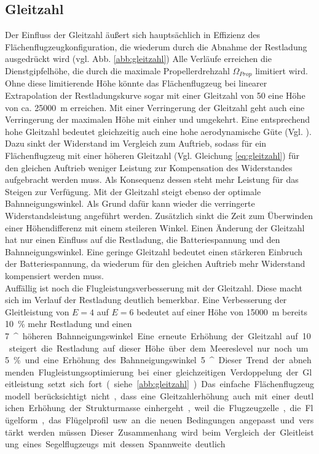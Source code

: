 \subsection{Gleitzahl}
\label{subsec:gleitzahl}
Der Einfluss der Gleitzahl äußert sich hauptsächlich in Effizienz des Flächenflugzeugkonfiguration, die wiederum durch die Abnahme der Restladung ausgedrückt wird (vgl. Abb. \ref{abb:gleitzahl})
Alle Verläufe erreichen die Dienstgipfelhöhe, die durch die maximale Propellerdrehzahl \ensuremath{\Omega_{Prop}} limitiert wird. Ohne diese limitierende Höhe könnte das Flächenflugzeug bei linearer Extrapolation der Restladungskurve sogar mit einer Gleitzahl von 50 eine Höhe von ca. \SI{25000}{m} erreichen. 
Mit einer Verringerung der Gleitzahl geht auch eine Verringerung der maximalen Höhe mit einher und umgekehrt. Eine entsprechend hohe Gleitzahl bedeutet gleichzeitig auch eine hohe aerodynamische Güte (Vgl. \cite[S.34]{Scheiderer.2008}). Dazu sinkt der Widerstand im Vergleich zum Auftrieb, sodass für ein Flächenflugzeug mit einer höheren Gleitzahl (Vgl. Gleichung \ref{eq:gleitzahl}) für den gleichen Auftrieb weniger Leistung zur Kompensation des Widerstandes aufgebracht werden muss. Als Konsequenz dessen steht mehr Leistung für das Steigen zur Verfügung. Mit der Gleitzahl steigt ebenso der optimale Bahnneigungswinkel. Als Grund dafür kann wieder die verringerte Widerstandsleistung angeführt werden. Zusätzlich sinkt die Zeit zum Überwinden einer Höhendifferenz mit einem steileren Winkel. Einen Änderung der Gleitzahl hat nur einen Einfluss auf die Restladung, die Batteriespannung und den Bahnneigungswinkel. Eine geringe Gleitzahl bedeutet einen stärkeren Einbruch der Batteriespannung, da wiederum für den gleichen Auftrieb mehr Widerstand kompensiert werden muss. \\
Auffällig ist noch die Flugleistungsverbesserung mit der Gleitzahl. Diese macht sich im Verlauf der Restladung deutlich bemerkbar. Eine Verbesserung der Gleitleistung von \ensuremath{E = 4} auf \ensuremath{E = 6} bedeutet auf einer Höhe von \SI{15000}{m} bereits \SI{10}{\%} mehr Restladung und einen \SI{7}{^\circ} höheren Bahnneigungswinkel. Eine erneute Erhöhung der Gleitzahl auf 10 steigert die Restladung auf dieser Höhe über dem  Meereslevel nur noch um \SI{5}{\%} und eine Erhöhung des Bahnneigungswinkel \SI{5}{^\circ}. Dieser Trend der abnehmenden Flugleistungsoptimierung bei einer gleichzeitigen Verdoppelung der Gleitleistung setzt sich fort (siehe \ref{abb:gleitzahl}).
Das einfache Flächenflugzeugmodell berücksichtigt nicht, dass eine Gleitzahlerhöhung auch mit einer deutlichen Erhöhung der Strukturmasse einhergeht, weil die Flugzeugzelle, die Flügelform, das Flügelprofil usw. an die neuen Bedingungen angepasst und verstärkt werden müssen. Dieser Zusammenhang wird beim Vergleich der Gleitleistung eines Segelflugzeugs mit dessen Spannweite deutlich. \\
